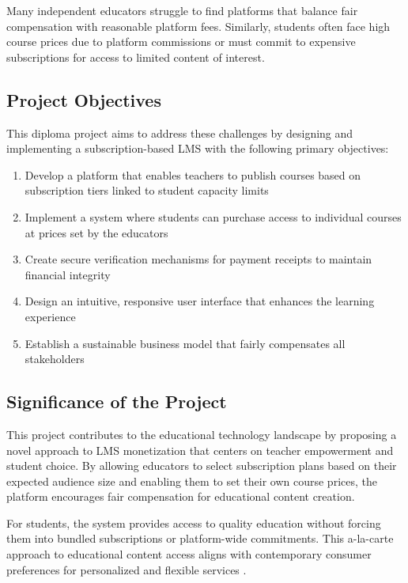 Many independent educators struggle to find platforms that balance fair compensation with reasonable platform fees. Similarly, students often face high course prices due to platform commissions or must commit to expensive subscriptions for access to limited content of interest.

\subsection{Project Objectives}

This diploma project aims to address these challenges by designing and implementing a subscription-based LMS with the following primary objectives:

\begin{enumerate}
    \item Develop a platform that enables teachers to publish courses based on subscription tiers linked to student capacity limits
    \item Implement a system where students can purchase access to individual courses at prices set by the educators
    \item Create secure verification mechanisms for payment receipts to maintain financial integrity
    \item Design an intuitive, responsive user interface that enhances the learning experience
    \item Establish a sustainable business model that fairly compensates all stakeholders
\end{enumerate}

\subsection{Significance of the Project}

This project contributes to the educational technology landscape by proposing a novel approach to LMS monetization that centers on teacher empowerment and student choice. By allowing educators to select subscription plans based on their expected audience size and enabling them to set their own course prices, the platform encourages fair compensation for educational content creation.

For students, the system provides access to quality education without forcing them into bundled subscriptions or platform-wide commitments. This a-la-carte approach to educational content access aligns with contemporary consumer preferences for personalized and flexible services \cite{hwang2018}.

